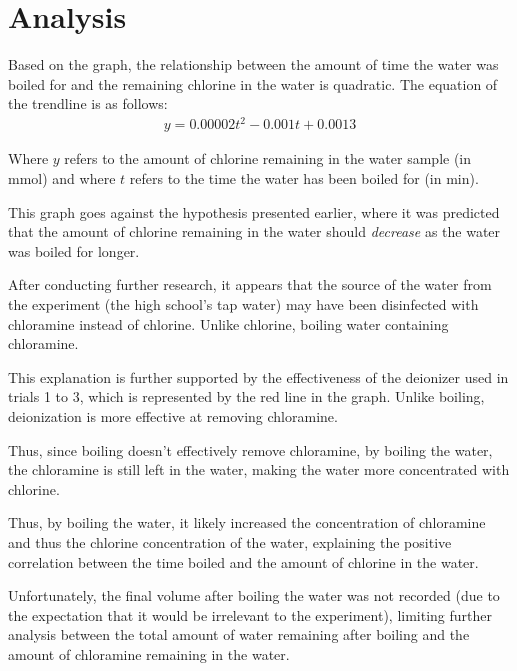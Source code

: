 \documentclass[11pt]{article}
\begin{document}
\section{Analysis}

Based on the graph, the relationship between the amount of time the water was boiled for and the remaining chlorine in the water is quadratic. The equation of the trendline is as follows:
%
\begin{align*}
	y = 0.00002t^2 - 0.001t + 0.0013
\end{align*}

Where $y$ refers to the amount of chlorine remaining in the water sample (in \si{\mmol}) and where $t$ refers to the time the water has been boiled for (in \si{\minute}).

This graph goes against the hypothesis presented earlier, where it was predicted that the amount of chlorine remaining in the water should \textit{decrease} as the water was boiled for longer.

After conducting further research, it appears that the source of the water from the experiment (the high school's tap water) may have been disinfected with chloramine instead of chlorine. Unlike chlorine, boiling water containing chloramine.

This explanation is further supported by the effectiveness of the deionizer used in trials 1 to 3, which is represented by the red line in the graph. Unlike boiling, deionization is more effective at removing chloramine.

Thus, since boiling doesn't effectively remove chloramine, by boiling the water, the chloramine is still left in the water, making the water more concentrated with chlorine.

Thus, by boiling the water, it likely increased the concentration of chloramine and thus the chlorine concentration of the water, explaining the positive correlation between the time boiled and the amount of chlorine in the water.

Unfortunately, the final volume after boiling the water was not recorded (due to the expectation that it would be irrelevant to the experiment), limiting further analysis between the total amount of water remaining after boiling and the amount of chloramine remaining in the water.

\end{document}
